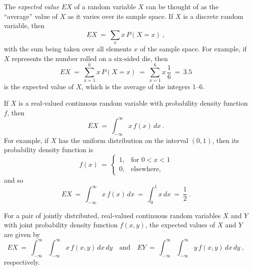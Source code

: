 The \emph{expected value} $EX$ of a random variable $X$ can be thought of as the ``average'' value of $X$ as it varies
over its sample space. If $X$ is a discrete random variable, then
\begin{equation}
 EX ~=~ \sum\limits_{x} x\,P(X=x)~,
\end{equation}
with the sum being taken over all elements $x$ of the sample space. For example, if $X$ represents the number rolled on
a six-sided die, then
\begin{equation}
 EX ~=~ \sum\limits_{x=1}^6 x\,P(X=x) ~=~ \sum\limits_{x=1}^6 x\,\frac{1}{6} ~=~ 3.5
\end{equation}
is the expected value of $X$, which is the average of the integers 1--6.

If $X$ is a real-valued continuous random variable with probability density function $f$, then
\begin{equation}
 EX ~=~ \int_{-\infty}^{\infty} x\,f(x)\,dx ~.
\end{equation}
For example, if $X$ has the uniform distribution on the interval $(0,1)$, then its probability density function is
\begin{equation}
 f(x) ~=~ \begin{cases}
  1, &\text{for $0 < x < 1$}\\
   0, &\text{elsewhere,}
 \end{cases}
\end{equation}
and so
\begin{equation}
 EX ~=~ \int_{-\infty}^{\infty} x\,f(x)\,dx ~=~ \int_0^1 x\,dx ~=~ \frac{1}{2} ~.
\end{equation}

For a pair of jointly distributed, real-valued continuous random variables $X$ and $Y$ with joint probability density function $f(x,y)$, the
expected values of $X$ and $Y$ are given by
\begin{equation}
 EX ~=~ \int_{-\infty}^{\infty} \int_{-\infty}^{\infty} x\,f(x,y)\,dx\,dy \quad\text{and}\quad
 EY ~=~ \int_{-\infty}^{\infty} \int_{-\infty}^{\infty} y\,f(x,y)\,dx\,dy ~,
\end{equation}
respectively.

